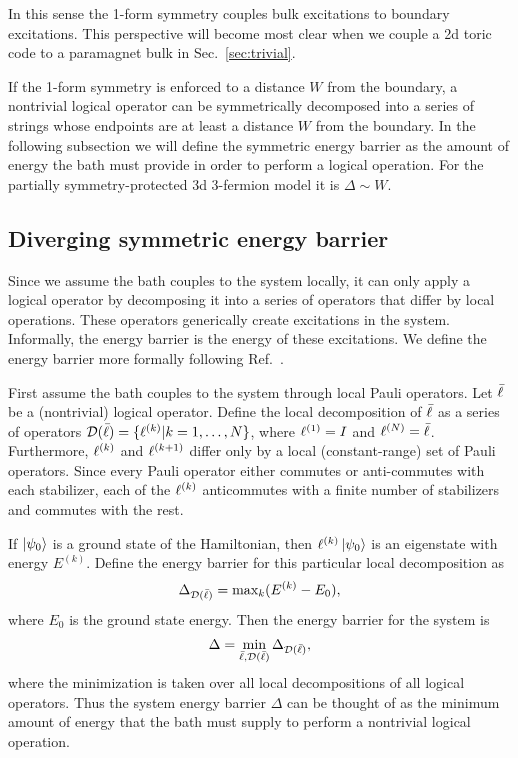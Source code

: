 In this sense the 1-form symmetry couples bulk excitations to boundary excitations. This perspective will become most clear when we couple a 2d toric code to a paramagnet bulk in Sec.~\ref{sec:trivial}.

If the 1-form symmetry is enforced to a distance $W$ from the boundary, a nontrivial logical operator can be symmetrically decomposed into a series of strings whose endpoints are at least a distance $W$ from the boundary. 
In the following subsection we will define the symmetric energy barrier as the amount of energy the bath must provide in order to perform a logical operation. For the partially symmetry-protected 3d 3-fermion model it is $\Delta\sim W$.

\subsection{Diverging symmetric energy barrier} \label{sub:ener}
	
Since we assume the bath couples to the system locally, it can only apply a logical operator by decomposing it into a series of operators that differ by local operations. These operators generically create excitations in the system. Informally, the energy barrier is the energy of these excitations. We define the energy barrier more formally following Ref.~\cite{RobertsBartlett2020}.
	
First assume the bath couples to the system through local Pauli operators. Let $\bar{\ell}$ be a (nontrivial) logical operator. Define the local decomposition of $\bar{\ell}$ as a series of operators $\mathcal{D}(\bar{\ell}) = \{\ell^{(k)}| k = 1,\dots,N\}$, where $\ell^{(1)}=I$ and $\ell^{(N)}=\bar{\ell}$. Furthermore, $\ell^{(k)}$ and $\ell^{(k+1)}$ differ only by a local (constant-range) set of Pauli operators. Since every Pauli operator either commutes or anti-commutes with each stabilizer, each of the $\ell^{(k)}$ anticommutes with a finite number of stabilizers and commutes with the rest.
	
If $\ket{\psi_0}$ is a ground state of the Hamiltonian, then $\ell^{(k)}\ket{\psi_0}$ is an eigenstate with energy $E^{(k)}$. Define the energy barrier for this particular local decomposition as
\begin{align}
\Delta_{\mathcal{D}(\bar{\ell})}=\text{max}_k(E^{(k)}-E_0),
\end{align}
where $E_0$ is the ground state energy. Then the energy barrier for the system is
\begin{align}
\Delta = \min_{\bar{\ell},\mathcal{D}(\bar{\ell})}\Delta_{\mathcal{D}(\bar{\ell})},
\end{align}
where the minimization is taken over all local decompositions of all logical operators. Thus the system energy barrier $\Delta$ can be thought of as the minimum amount of energy that the bath must supply to perform a nontrivial logical operation.

